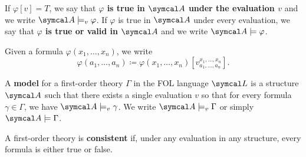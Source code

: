\begin{definition}
  If \( \varphi[v] = T \), we say that \textbf{\( \varphi \) is true in \( \Cal{A} \) under the evaluation \( v \)} and we write \( \Cal{A} \models_v \varphi \). If \( \varphi \) is true in \( \Cal{A} \) under every evaluation, we say that \textbf{\( \varphi \) is true or valid in \( \Cal{A} \)} and we write \( \Cal{A} \models \varphi \).

  Given a formula \( \varphi(x_1, \ldots, x_n) \), we write
  \begin{equation*}
    \varphi(a_1, \ldots, a_n) \coloneqq \varphi(x_1, \ldots, x_n)[v_{a_1, \ldots, a_n}^{x_1, \ldots, x_n}].
  \end{equation*}
\end{definition}

\begin{definition}\label{def:first_order_model}\cite[definition 4.4]{Nerode2012}
  A \textbf{model} for a first-order theory \( \Gamma \) in the FOL language \( \Cal{L} \) is a structure \( \Cal{A} \) such that there exists a single evaluation \( v \) so that for every formula \( \gamma \in \Gamma \), we have \( \Cal{A} \models_v \gamma \). We write \( \Cal{A} \models_v \Gamma \) or simply \( \Cal{A} \models \Gamma \).
\end{definition}

\begin{definition}\label{def:first_order_consistent}
  A first-order theory is \textbf{consistent} if, under any evaluation in any structure, every formula is either true or false.
\end{definition}

